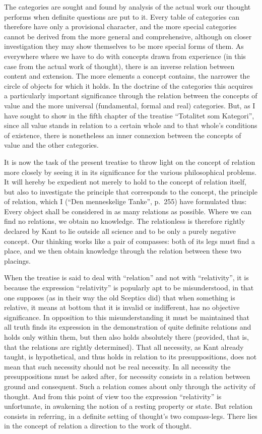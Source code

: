 \documentclass[12pt]{article}
\newcommand{\opage}[1]{\marginnote{\footnotesize\textit{[#1]}}}
\begin{document}
The categories are sought and found by analysis of the actual work our
thought performs when definite questions are put to it. Every table of
categories can therefore have only a provisional character, and the more
special categories cannot be derived from the more general and
comprehensive, although on closer investigation they may show themselves to
be more special forms of them. As everywhere where we have to do with
concepts drawn from experience (in this case from the actual work of
thought), there is an inverse relation between content and extension. The
more elements a concept contains, the narrower the circle of objects for
which it holds. In the doctrine of the categories this acquires a
particularly important significance through the relation between the
concepts of value and the more \opage{15}universal (fundamental, formal and real)
categories. But, as I have sought to show in the fifth chapter of the
treatise ``Totalitet som Kategori'', since all value stands in relation to a
certain whole and to that whole's conditions of existence, there is
nonetheless an inner connexion between the concepts of value and the other
categories.

It is now the task of the present treatise to throw light on the concept of
relation more closely by seeing it in its significance for the various
philosophical problems. It will hereby be expedient not merely to hold to
the concept of relation itself, but also to investigate the principle that
corresponds to the concept, the principle of relation, which I (``Den
menneskelige Tanke'', p.~255) have formulated thus: Every object shall be
considered in as many relations as possible. Where we can find no relations,
we obtain no knowledge. The relationless is therefore rightly declared by
Kant to lie outside all science and to be only a purely negative concept.
Our thinking works like a pair of compasses: both of its legs must find a
place, and we then obtain knowledge through the relation between these two
placings.

When the treatise is said to deal with ``relation'' and not with
``relativity'', it is because the expression ``relativity'' is popularly apt
to be misunderstood, in that one supposes (as in their way the old Sceptics
did) that when something is relative, it means at bottom that it is invalid
or indifferent, has no objective significance. In opposition to this
misunderstanding it must be maintained that all truth finds its expression
in the demonstration of quite definite relations and holds only within them,
but then also holds absolutely there (provided, that is, that the relations
are rightly determined). That all necessity, as Kant already taught, is
hypothetical, and thus holds in relation to its presuppositions, does not
mean \opage{16}that such necessity should not be real necessity. In all necessity the
presuppositions must be asked after, for necessity consists in a relation
between ground and consequent. Such a relation comes about only through the
activity of thought. And from this point of view too the expression
``relativity'' is unfortunate, in awakening the notion of a resting property
or state. But relation consists in referring, in a definite setting of
thought's two compass-legs. There lies in the concept of relation a
direction to the work of thought.
\end{document}
